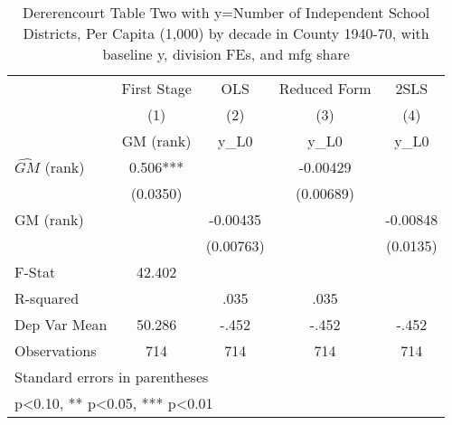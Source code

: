 \begin{table}[htbp]\centering
\def\sym#1{\ifmmode^{#1}\else\(^{#1}\)\fi}
\caption{Dererencourt Table Two with y=Number of Independent School Districts, Per Capita (1,000) by decade in County 1940-70, with baseline y, division FEs, and mfg share}
\begin{tabular}{l*{4}{c}}
\toprule
                    & First Stage   &         OLS   &Reduced Form   &        2SLS   \\
                    &\multicolumn{1}{c}{(1)}&\multicolumn{1}{c}{(2)}&\multicolumn{1}{c}{(3)}&\multicolumn{1}{c}{(4)}\\
                    &\multicolumn{1}{c}{GM  (rank)}&\multicolumn{1}{c}{y\_L0}&\multicolumn{1}{c}{y\_L0}&\multicolumn{1}{c}{y\_L0}\\
\midrule
$\hat{GM}$ (rank)   &       0.506***&               &    -0.00429   &               \\
                    &    (0.0350)   &               &   (0.00689)   &               \\
\addlinespace
GM  (rank)          &               &    -0.00435   &               &    -0.00848   \\
                    &               &   (0.00763)   &               &    (0.0135)   \\
\midrule
F-Stat              &      42.402   &               &               &               \\
R-squared           &               &        .035   &        .035   &               \\
Dep Var Mean        &      50.286   &       -.452   &       -.452   &       -.452   \\
Observations        &         714   &         714   &         714   &         714   \\
\bottomrule
\multicolumn{5}{l}{\footnotesize Standard errors in parentheses}\\
\multicolumn{5}{l}{\footnotesize * p<0.10, ** p<0.05, *** p<0.01}\\
\end{tabular}
\end{table}
